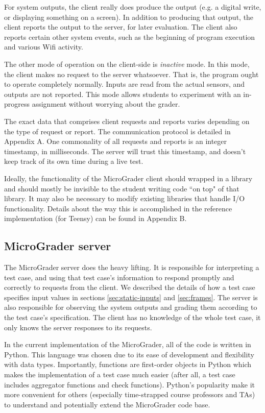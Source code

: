 \documentclass[12pt]{article}
\begin{document}
For system outputs, the client really does produce the output (e.g. a digital write, or displaying something on a screen).  In addition to producing that output, the client reports the output to the server, for later evaluation.  The client also reports certain other system events, such as the beginning of program execution and various Wifi activity.

The other mode of operation on the client-side is \textit{inactive} mode.  In this mode, the client makes no request to the server whatsoever.  That is, the program ought to operate completely normally.  Inputs are read from the actual sensors, and outputs are not reported.  This mode allows students to experiment with an in-progress assignment without worrying about the grader.

The exact data that comprises client requests and reports varies depending on the type of request or report.  The communication protocol is detailed in Appendix A.  One commonality of all requests and reports is an integer timestamp, in milliseconds.  The server will trust this timestamp, and doesn't keep track of its own time during a live test.

Ideally, the functionality of the MicroGrader client should wrapped in a library and should mostly be invisible to the student writing code ``on top" of that library.  It may also be necessary to modify existing libraries that handle I/O functionality.  Details about the way this is accomplished in the reference implementation (for Teensy) can be found in Appendix B.

\subsection{MicroGrader server}
The MicroGrader server does the heavy lifting.  It is responsible for interpreting a test case, and using that test case's information to respond promptly and correctly to requests from the client.  We described the details of how a test case specifies input values in sections \ref{sec:static-inputs} and \ref{sec:frames}.  The server is also responsible for observing the system outputs and grading them according to the test case's specification.  The client has no knowledge of the whole test case, it only knows the server responses to its requests.

In the current implementation of the MicroGrader, all of the code is written in Python.  This language was chosen due to its ease of development and flexibility with data types.  Importantly, functions are first-order objects in Python which makes the implementation of a test case much easier (after all, a test case includes aggregator functions and check functions).  Python's popularity make it more convenient for others (especially time-strapped course professors and TAs) to understand and potentially extend the MicroGrader code base.
\end{document}
